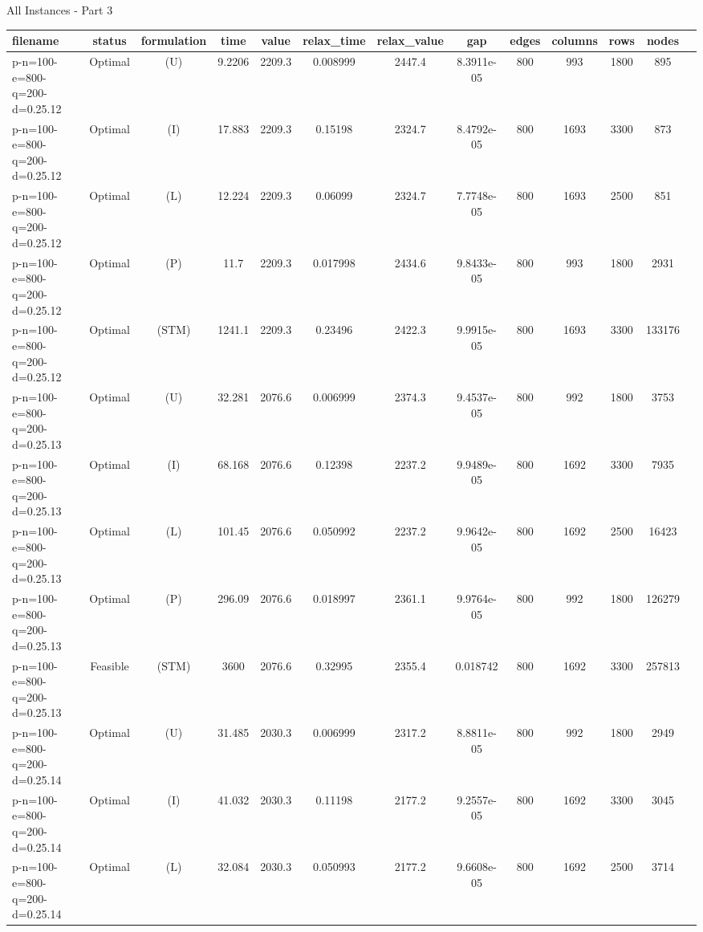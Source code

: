 \documentclass[landscape, a4paper]{article}
\newcommand{\STM}{\ensuremath{\mathrm{STM}}}
\newcommand{\Improved}{\ensuremath{\mathrm{I}}}
\newcommand{\Loose}{\ensuremath{\mathrm{L}}}
\newcommand{\Profit}{\ensuremath{\mathrm{P}}}
\newcommand{\Utility}{\ensuremath{\mathrm{U}}}
\begin{document}
\begin{center}
\newpage
All Instances - Part 3

\begin{tabular}{lcccccccccccc}
filename & status & formulation & time & value & relax\_time & relax\_value & gap & edges & columns & rows & nodes & \\
\hline
p-n=100-e=800-q=200-d=0.25.12 & Optimal & (\Utility) & 9.2206 & 2209.3 & 0.008999 & 2447.4 & 8.3911e-05 & 800 & 993 & 1800 & 895 & \\
p-n=100-e=800-q=200-d=0.25.12 & Optimal & (\Improved) & 17.883 & 2209.3 & 0.15198 & 2324.7 & 8.4792e-05 & 800 & 1693 & 3300 & 873 & \\
p-n=100-e=800-q=200-d=0.25.12 & Optimal & (\Loose) & 12.224 & 2209.3 & 0.06099 & 2324.7 & 7.7748e-05 & 800 & 1693 & 2500 & 851 & \\
p-n=100-e=800-q=200-d=0.25.12 & Optimal & (\Profit) & 11.7 & 2209.3 & 0.017998 & 2434.6 & 9.8433e-05 & 800 & 993 & 1800 & 2931 & \\
p-n=100-e=800-q=200-d=0.25.12 & Optimal & (\STM) & 1241.1 & 2209.3 & 0.23496 & 2422.3 & 9.9915e-05 & 800 & 1693 & 3300 & 133176 & \\
p-n=100-e=800-q=200-d=0.25.13 & Optimal & (\Utility) & 32.281 & 2076.6 & 0.006999 & 2374.3 & 9.4537e-05 & 800 & 992 & 1800 & 3753 & \\
p-n=100-e=800-q=200-d=0.25.13 & Optimal & (\Improved) & 68.168 & 2076.6 & 0.12398 & 2237.2 & 9.9489e-05 & 800 & 1692 & 3300 & 7935 & \\
p-n=100-e=800-q=200-d=0.25.13 & Optimal & (\Loose) & 101.45 & 2076.6 & 0.050992 & 2237.2 & 9.9642e-05 & 800 & 1692 & 2500 & 16423 & \\
p-n=100-e=800-q=200-d=0.25.13 & Optimal & (\Profit) & 296.09 & 2076.6 & 0.018997 & 2361.1 & 9.9764e-05 & 800 & 992 & 1800 & 126279 & \\
p-n=100-e=800-q=200-d=0.25.13 & Feasible & (\STM) & 3600 & 2076.6 & 0.32995 & 2355.4 & 0.018742 & 800 & 1692 & 3300 & 257813 & \\
p-n=100-e=800-q=200-d=0.25.14 & Optimal & (\Utility) & 31.485 & 2030.3 & 0.006999 & 2317.2 & 8.8811e-05 & 800 & 992 & 1800 & 2949 & \\
p-n=100-e=800-q=200-d=0.25.14 & Optimal & (\Improved) & 41.032 & 2030.3 & 0.11198 & 2177.2 & 9.2557e-05 & 800 & 1692 & 3300 & 3045 & \\
p-n=100-e=800-q=200-d=0.25.14 & Optimal & (\Loose) & 32.084 & 2030.3 & 0.050993 & 2177.2 & 9.6608e-05 & 800 & 1692 & 2500 & 3714 & \\

\end{tabular}
\end{center}
\end{document}
